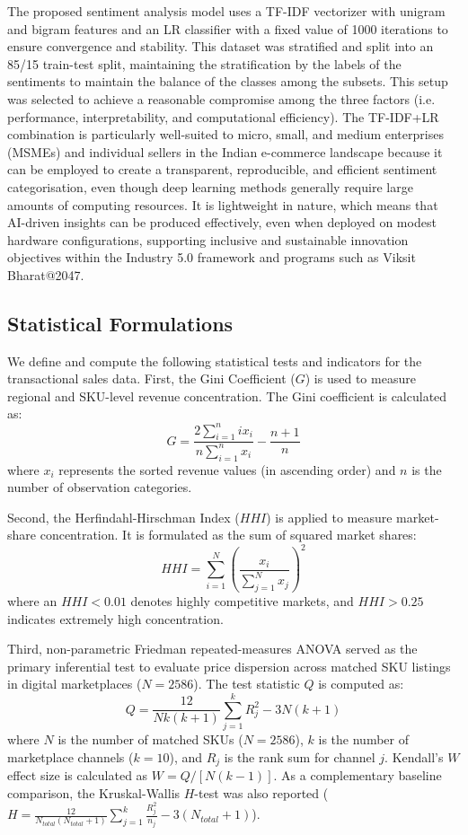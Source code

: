 \documentclass[authoryear,review,3p,times,12pt]{elsarticle}
\begin{document}
The proposed sentiment analysis model uses a TF-IDF vectorizer with unigram and bigram features and an LR classifier with a fixed value of 1000 iterations to ensure convergence and stability. This dataset was stratified and split into an 85/15 train-test split, maintaining the stratification by the labels of the sentiments to maintain the balance of the classes among the subsets. This setup was selected to achieve a reasonable compromise among the three factors (i.e. performance, interpretability, and computational efficiency). The TF-IDF+LR combination is particularly well-suited to micro, small, and medium enterprises (MSMEs) and individual sellers in the Indian e-commerce landscape because it can be employed to create a transparent, reproducible, and efficient sentiment categorisation, even though deep learning methods generally require large amounts of computing resources. It is lightweight in nature, which means that AI-driven insights can be produced effectively, even when deployed on modest hardware configurations, supporting inclusive and sustainable innovation objectives within the Industry 5.0 framework and programs such as Viksit Bharat@2047.

\subsection{Statistical Formulations}
We define and compute the following statistical tests and indicators for the transactional sales data. First, the Gini Coefficient ($G$) is used to measure regional and SKU-level revenue concentration. The Gini coefficient is calculated as:
\begin{equation}
    G = \frac{2 \sum_{i=1}^n i x_i}{n \sum_{i=1}^n x_i} - \frac{n+1}{n}
\end{equation}
where $x_i$ represents the sorted revenue values (in ascending order) and $n$ is the number of observation categories.

Second, the Herfindahl-Hirschman Index ($HHI$) is applied to measure market-share concentration. It is formulated as the sum of squared market shares:
\begin{equation}
    HHI = \sum_{i=1}^N \left( \frac{x_i}{\sum_{j=1}^N x_j} \right)^2
\end{equation}
where an $HHI < 0.01$ denotes highly competitive markets, and $HHI > 0.25$ indicates extremely high concentration.

Third, non-parametric Friedman repeated-measures ANOVA served as the primary inferential test to evaluate price dispersion across matched SKU listings in digital marketplaces ($N = 2586$). The test statistic $Q$ is computed as:
\begin{equation}
    Q = \frac{12}{N k (k+1)} \sum_{j=1}^k R_j^2 - 3 N (k+1)
\end{equation}
where $N$ is the number of matched SKUs ($N=2586$), $k$ is the number of marketplace channels ($k=10$), and $R_j$ is the rank sum for channel $j$. Kendall's $W$ effect size is calculated as $W = Q / [N(k-1)]$. As a complementary baseline comparison, the Kruskal-Wallis $H$-test was also reported ($H = \frac{12}{N_{total}(N_{total}+1)} \sum_{j=1}^k \frac{R_j^2}{n_j} - 3(N_{total}+1)$).
\end{document}
